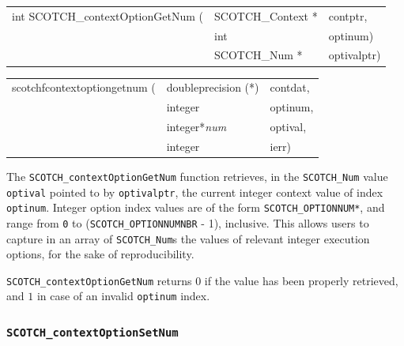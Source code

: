 \begin{itemize}
\progsyn

{\tt\begin{tabular}{l@{}ll}
int SCOTCH\_contextOptionGetNum ( & SCOTCH\_Context * & contptr, \\
                                  & int               & optinum) \\
                                  & SCOTCH\_Num *     & optivalptr)
\end{tabular}}

{\tt\begin{tabular}{l@{}ll}
scotchfcontextoptiongetnum ( & doubleprecision (*) & contdat, \\
                             & integer             & optinum, \\
                             & integer*{\it num}   & optival, \\
                             & integer             & ierr)
\end{tabular}}

\progdes

The \texttt{SCOTCH\_contextOptionGetNum} function retrieves, in
the \texttt{SCOTCH\_\lbt Num} value \texttt{optival} pointed to by
\texttt{optivalptr}, the current integer context value of index
\texttt{optinum}. Integer option index values are of the form
\texttt{SCOTCH\_\lbt OPTIONNUM*}, and range from
\texttt{0} to (\texttt{SCOTCH\_\lbt OPTIONNUMNBR} - 1),
inclusive. This allows users to capture in an array of
\texttt{SCOTCH\_\lbt Num}s the values of relevant integer
execution options, for the sake of reproducibility.

\progret

\texttt{SCOTCH\_contextOptionGetNum} returns $0$ if the value has been
properly retrieved, and $1$ in case of an invalid \texttt{optinum}
index.
\end{itemize}

\subsubsection{\texttt{SCOTCH\_contextOptionSetNum}}
\label{sec-lib-context-option-set-num}

